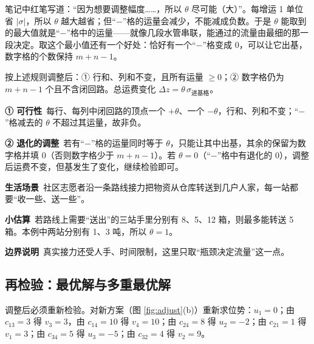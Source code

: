 \begin{intuitionbox}
笔记中红笔写道：“因为想要调整幅度……，所以 $\theta$ 尽可能（大）”。每增运 1 单位省 $|\sigma|$，所以 $\theta$ 越大越省；但“$-$”格的运量会减少，不能减成负数。于是 $\theta$ 能取到的最大值就是“$-$”格中的运量——就像几段水管串联，能通过的流量由最细的那一段决定。取这个最小值还有一个好处：恰好有一个“$-$”格变成 0，可以让它出基，数字格的个数保持 $m+n-1$。
\end{intuitionbox}

\begin{theorembox}[调整后仍是基可行解]
按上述规则调整后：① 行和、列和不变，且所有运量 $\ge0$；② 数字格仍为 $m+n-1$ 个且不含闭回路。总运费变化 $\Delta z=\theta\,\sigma_{\text{进基格}}$。
\end{theorembox}
\begin{supplementbox}[两点说明]
\textbf{① 可行性}\ 每行、每列中闭回路的顶点一个 $+\theta$、一个 $-\theta$，行和、列和不变；“$-$”格减去的 $\theta$ 不超过其运量，故非负。\par
\textbf{② 退化的调整}\ 若有“$-$”格的运量同时等于 $\theta$，只能让其中出基，其余的保留为数字格并填 0（否则数字格少于 $m+n-1$）。若 $\theta=0$（“$-$”格中有退化的 0），调整后运费不变，但基发生了变化，继续检验即可。
\end{supplementbox}

\begin{lifebox}[接力传递物资]
\textbf{生活场景}\ 社区志愿者沿一条路线接力把物资从仓库转送到几户人家，每一站都要“收一些、送一些”。\par
{}
\textbf{小估算}\ 若路线上需要“送出”的三站手里分别有 8、5、12 箱，则最多能转送 5 箱。本例中两站分别有 1、3 吨，所以 $\theta=1$。\par
\textbf{边界说明}\ 真实接力还受人手、时间限制，这里只取“瓶颈决定流量”这一点。
\end{lifebox}

\subsection{再检验：最优解与多重最优解}
调整后必须重新检验。对新方案（图 \ref{fig:adjust}(b)）重新求位势：$u_1=0$；由 $c_{13}=3$ 得 $v_3=3$，由 $c_{14}=10$ 得 $v_4=10$；由 $c_{24}=8$ 得 $u_2=-2$；由 $c_{21}=1$ 得 $v_1=3$；由 $c_{34}=5$ 得 $u_3=-5$；由 $c_{32}=4$ 得 $v_2=9$。

